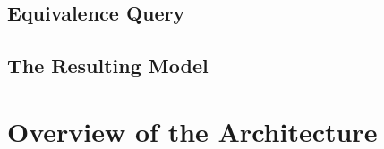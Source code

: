 \subsection{Equivalence Query} \label{subs_eq}
\subsection{The Resulting Model} \label{subs_resultingmodel}

\section{Overview of the Architecture} \label{sec_architecture}
